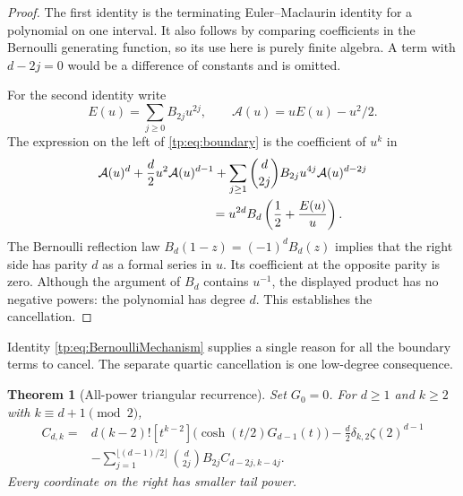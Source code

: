 \documentclass[11pt,a4paper]{article}
\numberwithin{equation}{section}
\newtheorem{theorem}{Theorem}[section]
\theoremstyle{definition}
\theoremstyle{remark}
\begin{document}
\begin{proof}
The first identity is the terminating Euler--Maclaurin identity for a
polynomial on one interval.  It also follows by comparing coefficients
in the Bernoulli generating function, so its use here is purely finite
algebra.  A term with $d-2j=0$ would be a difference of constants and is
omitted.

For the second identity write
\[
 E(u)=\sum_{j\geq0}B_{2j}u^{2j},\qquad
 \mathcal A(u)=uE(u)-u^2/2.
\]
The expression on the left of \eqref{tp:eq:boundary} is the coefficient
of $u^k$ in
\begin{equation}\label{tp:eq:BernoulliMechanism}
 \begin{split}
 &\mathcal A(u)^d+\frac d2u^2\mathcal A(u)^{d-1}
 +\sum_{j\geq1}\binom d{2j}B_{2j}u^{4j}\mathcal A(u)^{d-2j}\\
 &\hspace{32mm}=u^{2d}B_d\left(\frac12+\frac{E(u)}u\right).
 \end{split}
\end{equation}
The Bernoulli reflection law $B_d(1-z)=(-1)^dB_d(z)$ implies that
the right side has parity $d$ as a formal series in $u$.  Its
coefficient at the opposite parity is zero.  Although the argument of
$B_d$ contains $u^{-1}$, the displayed product has no negative powers:
the polynomial has degree $d$.  This establishes the cancellation.
\end{proof}

Identity \eqref{tp:eq:BernoulliMechanism} supplies a single reason for
all the boundary terms to cancel.  The separate quartic cancellation
is one low-degree consequence.

\begin{theorem}[All-power triangular recurrence]
\label{tp:thm:recurrence}
Set $G_0=0$.  For $d\geq1$ and $k\geq2$ with
$k\equiv d+1\pmod2$,
\begin{equation}\label{tp:eq:recurrence}
 \boxed{\begin{aligned}
 C_{d,k}={}&d(k-2)![t^{k-2}]\bigl(\cosh(t/2)G_{d-1}(t)\bigr)
       -\frac d2\delta_{k,2}\zeta(2)^{d-1}\\
 &-\sum_{j=1}^{\lfloor(d-1)/2\rfloor}
       \binom d{2j}B_{2j}C_{d-2j,k-4j}.
 \end{aligned}}
\end{equation}
Every coordinate on the right has smaller tail power.
\end{theorem}
\end{document}
